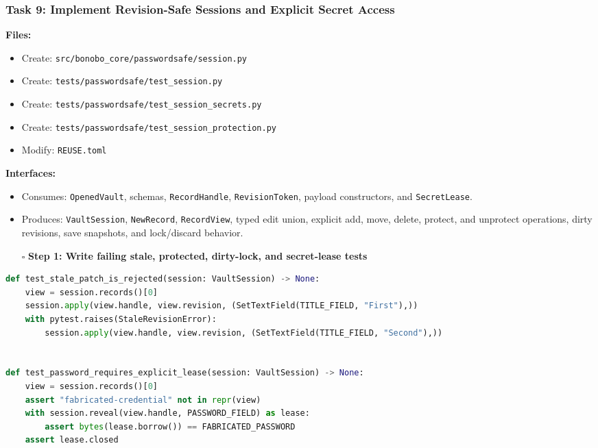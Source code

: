\documentclass[
  letterpaper,
]{article}
\newcommand{\passthrough}[1]{#1}
\providecommand{\tightlist}{%
  \setlength{\itemsep}{0pt}\setlength{\parskip}{0pt}}
\begin{document}
\subsubsection{Task 9: Implement Revision-Safe Sessions and Explicit Secret
Access}\label{task-9-implement-revision-safe-sessions-and-explicit-secret-access}

\textbf{Files:}

\begin{itemize}
\tightlist
\item
  Create: \nolinkurl{src/bonobo_core/passwordsafe/session.py}
\item
  Create: \nolinkurl{tests/passwordsafe/test_session.py}
\item
  Create: \nolinkurl{tests/passwordsafe/test_session_secrets.py}
\item
  Create: \nolinkurl{tests/passwordsafe/test_session_protection.py}
\item
  Modify: \nolinkurl{REUSE.toml}
\end{itemize}

\textbf{Interfaces:}

\begin{itemize}
\tightlist
\item
  Consumes: \nolinkurl{OpenedVault}, schemas, \nolinkurl{RecordHandle}, \nolinkurl{RevisionToken}, payload constructors,
  and \nolinkurl{SecretLease}.
\item
  Produces: \nolinkurl{VaultSession}, \passthrough{\lstinline!NewRecord!}, \nolinkurl{RecordView}, typed edit union,
  explicit add, move, delete, protect, and unprotect operations, dirty revisions, save snapshots, and lock/discard
  behavior.
\end{itemize}

\begin{itemize}
\tightlist
\item[$\square$]
  \textbf{Step 1: Write failing stale, protected, dirty-lock, and secret-lease tests}
\end{itemize}

\begin{lstlisting}[language=Python]
def test_stale_patch_is_rejected(session: VaultSession) -> None:
    view = session.records()[0]
    session.apply(view.handle, view.revision, (SetTextField(TITLE_FIELD, "First"),))
    with pytest.raises(StaleRevisionError):
        session.apply(view.handle, view.revision, (SetTextField(TITLE_FIELD, "Second"),))


def test_password_requires_explicit_lease(session: VaultSession) -> None:
    view = session.records()[0]
    assert "fabricated-credential" not in repr(view)
    with session.reveal(view.handle, PASSWORD_FIELD) as lease:
        assert bytes(lease.borrow()) == FABRICATED_PASSWORD
    assert lease.closed
\end{lstlisting}
\end{document}
